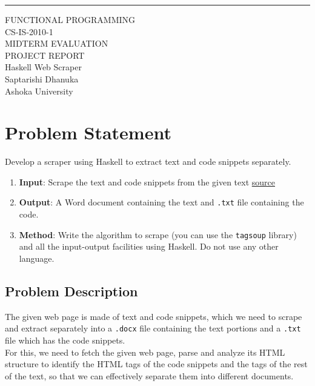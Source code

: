 \documentclass{scrreprt}
\date{}
\begin{document}
\begin{flushright}
    \rule{16cm}{5pt}\vskip1cm
    \begin{bfseries}
        \Huge{FUNCTIONAL PROGRAMMING \\ CS-IS-2010-1 \\ MIDTERM EVALUATION \\ PROJECT REPORT}\\
        \vspace{1.9cm}
        Haskell Web Scraper\\
        \vspace{1.9cm}
        Saptarishi Dhanuka\\
        \vspace{1.9cm}
        Ashoka University\\
    \end{bfseries}
\end{flushright}

\tableofcontents



\chapter{Problem Statement}
\begin{tcolorbox}[colback=white,colframe=gray,title={Assigned Project Statement}]
    Develop a scraper using Haskell to extract text and code snippets separately.
    \begin{enumerate}
        \item \textbf{Input}: Scrape the text and code snippets from the given text \href{https://eli.thegreenplace.net/2018/type-erasure-and-reification/}{source}
        \item \textbf{Output}: A Word document containing the text and \texttt{.txt} file containing the code.
        \item \textbf{Method}: Write the algorithm to scrape (you can use the \texttt{tagsoup} library) and all the input-output facilities using Haskell. Do not use any other language.
    \end{enumerate}
\end{tcolorbox}


\section{Problem Description}
The given web page is made of text and code snippets, which we need to scrape and extract separately into a \texttt{.docx} file containing the text portions and a \texttt{.txt} file which has the code snippets. \\ For this, we need to fetch the given web page, parse and analyze its HTML structure to identify the HTML tags of the code snippets and the tags of the rest of the text, so that we can effectively separate them into different documents.
\end{document}
